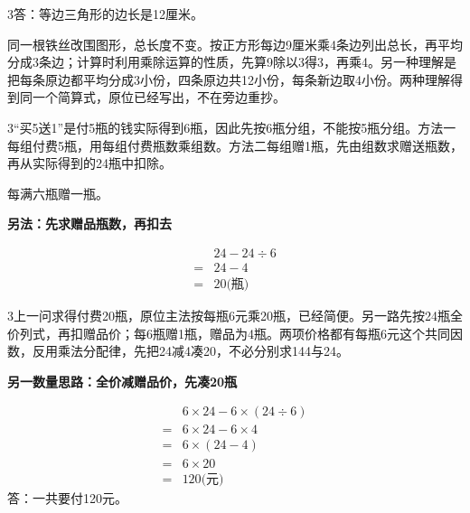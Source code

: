 \documentclass[multi=snippet,border={5bp 20bp 5bp 5bp}]{standalone}
\newenvironment{snippet}[3]{\begin{minipage}{#1bp}\color{answerred}\fontsize{#2}{#3}\selectfont\raggedright}{\end{minipage}}
\begin{document}
\begin{snippet}{505}{11.5}{14}\begin{multicols}{3}\raggedcolumns 答：等边三角形的边长是12厘米。\par 同一根铁丝改围图形，总长度不变。按正方形每边9厘米乘4条边列出总长，再平均分成3条边；计算时利用乘除运算的性质，先算9除以3得3，再乘4。另一种理解是把每条原边都平均分成3小份，四条原边共12小份，每条新边取4小份。两种理解得到同一个简算式，原位已经写出，不在旁边重抄。\end{multicols}\end{snippet}
\begin{snippet}{505}{11.5}{14}\begin{multicols}{3}\raggedcolumns “买5送1”是付5瓶的钱实际得到6瓶，因此先按6瓶分组，不能按5瓶分组。方法一每组付费5瓶，用每组付费瓶数乘组数。方法二每组赠1瓶，先由组数求赠送瓶数，再从实际得到的24瓶中扣除。\par 每满六瓶赠一瓶。\par \textbf{另法：先求赠品瓶数，再扣去}\par \[\begin{aligned}&24-24\div6\\={}&24-4\\={}&20\text{(瓶)}\end{aligned}\]\end{multicols}\end{snippet}
\begin{snippet}{505}{11.5}{14}\begin{multicols}{3}\raggedcolumns 上一问求得付费20瓶，原位主法按每瓶6元乘20瓶，已经简便。另一路先按24瓶全价列式，再扣赠品价；每6瓶赠1瓶，赠品为4瓶。两项价格都有每瓶6元这个共同因数，反用乘法分配律，先把24减4凑20，不必分别求144与24。\par \textbf{另一数量思路：全价减赠品价，先凑20瓶}\par \[\begin{aligned}&6\times24-6\times(24\div6)\\={}&6\times24-6\times4\\={}&6\times(24-4)\\={}&6\times20\\={}&120\text{(元)}\end{aligned}\]答：一共要付120元。\end{multicols}\end{snippet}
\end{document}
